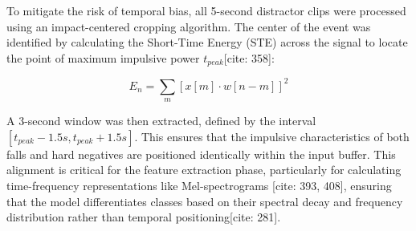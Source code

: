 \documentclass[11pt, a4paper, twoside]{article}
\begin{document}
To mitigate the risk of temporal bias, all 5-second distractor clips were processed using an impact-centered cropping algorithm. The center of the event was identified by calculating the Short-Time Energy (STE) across the signal to locate the point of maximum impulsive power $t_{peak}$[cite: 358]:

\begin{equation}
E_n = \sum_{m} [x[m] \cdot w[n-m]]^2
\end{equation}

A 3-second window was then extracted, defined by the interval $[t_{peak} - 1.5s, t_{peak} + 1.5s]$. This ensures that the impulsive characteristics of both falls and hard negatives are positioned identically within the input buffer. This alignment is critical for the feature extraction phase, particularly for calculating time-frequency representations like Mel-spectrograms [cite: 393, 408], ensuring that the model differentiates classes based on their spectral decay and frequency distribution rather than temporal positioning[cite: 281].


\end{document}

